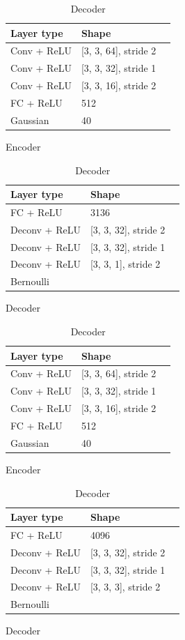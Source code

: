 \begin{table}
\centering
\caption{Network architectures for MNIST and Omniglot}
\begin{subfigure}[h]{0.4\textwidth}
\caption{Encoder}
\begin{tabular}{lll}
\toprule
Layer type & Shape \\
\midrule
Conv + ReLU & [3, 3, 64], stride 2 \\
Conv + ReLU & [3, 3, 32], stride 1 \\
Conv + ReLU & [3, 3, 16], stride 2 \\
FC + ReLU & 512 \\
Gaussian & 40 \\
\bottomrule
\end{tabular}
\end{subfigure}
\begin{subfigure}[h]{0.4\textwidth}
\caption{Decoder}
\begin{tabular}{lll}
\toprule
Layer type & Shape \\
\midrule
FC + ReLU & 3136 \\
Deconv + ReLU & [3, 3, 32], stride 2 \\
Deconv + ReLU & [3, 3, 32], stride 1 \\
Deconv + ReLU & [3, 3, 1], stride 2 \\
Bernoulli & \\
\bottomrule
\end{tabular}
\end{subfigure}
\label{tab:mnist-arch}
\end{table}

\begin{table}
\centering
\caption{Network architectures for CelebA}
\begin{subfigure}[h]{0.4\textwidth}
\caption{Encoder}
\begin{tabular}{lll}
\toprule
Layer type & Shape \\
\midrule
Conv + ReLU & [3, 3, 64], stride 2 \\
Conv + ReLU & [3, 3, 32], stride 1 \\
Conv + ReLU & [3, 3, 16], stride 2 \\
FC + ReLU & 512 \\
Gaussian & 40 \\
\bottomrule
\end{tabular}
\end{subfigure}
\begin{subfigure}[h]{0.4\textwidth}
\caption{Decoder}
\begin{tabular}{lll}
\toprule
Layer type & Shape \\
\midrule
FC + ReLU & 4096 \\
Deconv + ReLU & [3, 3, 32], stride 2 \\
Deconv + ReLU & [3, 3, 32], stride 1 \\
Deconv + ReLU & [3, 3, 3], stride 2 \\
Bernoulli & \\
\bottomrule
\end{tabular}
\end{subfigure}
\label{tab:celeba-arch}
\end{table}

